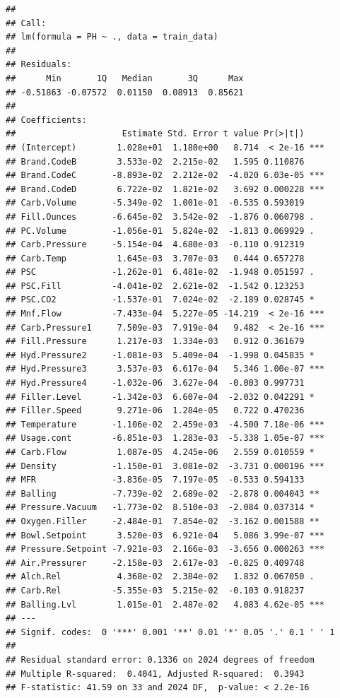 \documentclass[]{article}
\begin{document}
\begin{verbatim}
## 
## Call:
## lm(formula = PH ~ ., data = train_data)
## 
## Residuals:
##      Min       1Q   Median       3Q      Max 
## -0.51863 -0.07572  0.01150  0.08913  0.85621 
## 
## Coefficients:
##                     Estimate Std. Error t value Pr(>|t|)    
## (Intercept)        1.028e+01  1.180e+00   8.714  < 2e-16 ***
## Brand.CodeB        3.533e-02  2.215e-02   1.595 0.110876    
## Brand.CodeC       -8.893e-02  2.212e-02  -4.020 6.03e-05 ***
## Brand.CodeD        6.722e-02  1.821e-02   3.692 0.000228 ***
## Carb.Volume       -5.349e-02  1.001e-01  -0.535 0.593019    
## Fill.Ounces       -6.645e-02  3.542e-02  -1.876 0.060798 .  
## PC.Volume         -1.056e-01  5.824e-02  -1.813 0.069929 .  
## Carb.Pressure     -5.154e-04  4.680e-03  -0.110 0.912319    
## Carb.Temp          1.645e-03  3.707e-03   0.444 0.657278    
## PSC               -1.262e-01  6.481e-02  -1.948 0.051597 .  
## PSC.Fill          -4.041e-02  2.621e-02  -1.542 0.123253    
## PSC.CO2           -1.537e-01  7.024e-02  -2.189 0.028745 *  
## Mnf.Flow          -7.433e-04  5.227e-05 -14.219  < 2e-16 ***
## Carb.Pressure1     7.509e-03  7.919e-04   9.482  < 2e-16 ***
## Fill.Pressure      1.217e-03  1.334e-03   0.912 0.361679    
## Hyd.Pressure2     -1.081e-03  5.409e-04  -1.998 0.045835 *  
## Hyd.Pressure3      3.537e-03  6.617e-04   5.346 1.00e-07 ***
## Hyd.Pressure4     -1.032e-06  3.627e-04  -0.003 0.997731    
## Filler.Level      -1.342e-03  6.607e-04  -2.032 0.042291 *  
## Filler.Speed       9.271e-06  1.284e-05   0.722 0.470236    
## Temperature       -1.106e-02  2.459e-03  -4.500 7.18e-06 ***
## Usage.cont        -6.851e-03  1.283e-03  -5.338 1.05e-07 ***
## Carb.Flow          1.087e-05  4.245e-06   2.559 0.010559 *  
## Density           -1.150e-01  3.081e-02  -3.731 0.000196 ***
## MFR               -3.836e-05  7.197e-05  -0.533 0.594133    
## Balling           -7.739e-02  2.689e-02  -2.878 0.004043 ** 
## Pressure.Vacuum   -1.773e-02  8.510e-03  -2.084 0.037314 *  
## Oxygen.Filler     -2.484e-01  7.854e-02  -3.162 0.001588 ** 
## Bowl.Setpoint      3.520e-03  6.921e-04   5.086 3.99e-07 ***
## Pressure.Setpoint -7.921e-03  2.166e-03  -3.656 0.000263 ***
## Air.Pressurer     -2.158e-03  2.617e-03  -0.825 0.409748    
## Alch.Rel           4.368e-02  2.384e-02   1.832 0.067050 .  
## Carb.Rel          -5.355e-03  5.215e-02  -0.103 0.918237    
## Balling.Lvl        1.015e-01  2.487e-02   4.083 4.62e-05 ***
## ---
## Signif. codes:  0 '***' 0.001 '**' 0.01 '*' 0.05 '.' 0.1 ' ' 1
## 
## Residual standard error: 0.1336 on 2024 degrees of freedom
## Multiple R-squared:  0.4041, Adjusted R-squared:  0.3943 
## F-statistic: 41.59 on 33 and 2024 DF,  p-value: < 2.2e-16
\end{verbatim}
\end{document}
